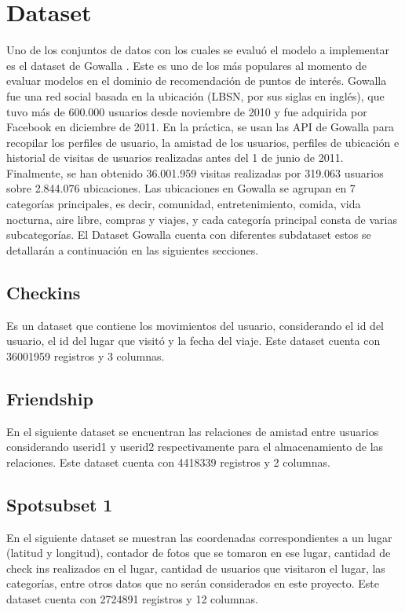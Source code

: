 \documentclass[sigplan,screen]{acmart}
\begin{document}
\section{Dataset}
Uno de los conjuntos de datos con los cuales se evaluó el modelo a implementar es el dataset de Gowalla \cite{gowalla}. Este es uno de los más populares al momento de evaluar modelos en el dominio de recomendación de puntos de interés.
Gowalla fue una red social basada en la ubicación (LBSN, por sus siglas en inglés), que tuvo más de 600.000 usuarios desde noviembre de 2010 y fue adquirida por Facebook en diciembre de 2011. En la práctica, se usan las API de Gowalla para recopilar los perfiles de usuario, la amistad de los usuarios, perfiles de ubicación e historial de visitas de usuarios realizadas antes del 1 de junio de 2011. Finalmente, se han obtenido 36.001.959 visitas realizadas por 319.063 usuarios sobre 2.844.076 ubicaciones. Las ubicaciones en Gowalla se agrupan en 7 categorías principales, es decir, comunidad, entretenimiento, comida, vida nocturna, aire libre, compras y viajes, y cada categoría principal consta de varias subcategorías.
El Dataset Gowalla cuenta con diferentes subdataset estos se detallarán a continuación en las siguientes secciones.

\subsection{Checkins}
Es un dataset que contiene los movimientos del usuario, considerando el id del usuario, el id del lugar que visitó y la fecha del viaje. Este dataset cuenta con 36001959 registros y 3 columnas.

\subsection{Friendship}
En el siguiente dataset se encuentran las relaciones de amistad entre usuarios considerando userid1 y userid2 respectivamente para el almacenamiento de las relaciones. Este dataset cuenta con 4418339 registros y 2 columnas.

\subsection{Spotsubset 1}
En el siguiente dataset se muestran las coordenadas correspondientes a un lugar (latitud y longitud), contador de fotos que se tomaron en ese lugar, cantidad de check ins realizados en el lugar, cantidad de usuarios que visitaron el lugar, las categorías, entre otros datos que no serán considerados en este proyecto. Este dataset cuenta con 2724891 registros y 12 columnas.
\end{document}
